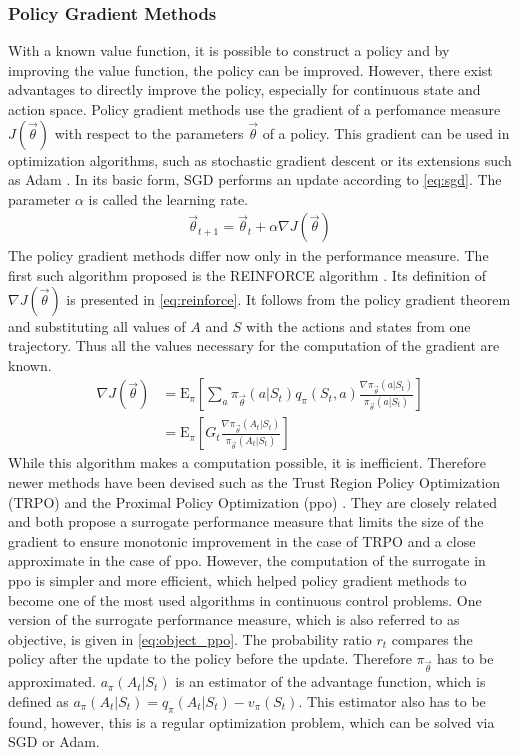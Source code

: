 \subsubsection{Policy Gradient Methods}
With a known value function, it is possible to construct a policy and by improving the value function, the policy can be improved. However, there exist advantages to directly improve the policy, especially for continuous state and action space. Policy gradient methods use the gradient of a perfomance measure $J(\vec{\theta})$ with respect to the parameters $\vec{\theta}$ of a policy. This gradient can be used in optimization algorithms, such as stochastic gradient descent \cite[p. 201]{sutton_reinforcement_2018} or its extensions such as Adam \cite{kingma_adam_2017}. In its basic form, SGD performs an update according to \ref{eq:sgd}. The parameter $\alpha$ is called the learning rate.
\begin{align}
	\vec{\theta}_{t+1} = \vec{\theta}_t + \alpha \nabla J(\vec{\theta}) \label{eq:sgd}
\end{align}
The policy gradient methods differ now only in the performance measure. The first such algorithm proposed is the REINFORCE algorithm \cite{williams_simple_1992}. Its definition of $\nabla J(\vec{\theta})$ is presented in \eqref{eq:reinforce}. It follows from the policy gradient theorem and substituting all values of $A$ and $S$ with the actions and states from one trajectory. Thus all the values necessary for the computation of the gradient are known. \cite[p.324-328]{sutton_reinforcement_2018}
\begin{align}
	\nabla J(\vec{\theta}) 
	&= \mathrm{E}_\pi \left[ \sum_{a} \pi_{\vec{\theta}} (a\vert S_t) q_\pi(S_t, a)
	\frac{\nabla \pi_{\vec{\theta}}(a\vert S_t)}{\pi_{\vec{\theta}}(a\vert S_t)} \right]\label{eq:reinforce} \\
	&= \mathrm{E}_\pi \left[G_t \frac{\nabla \pi_{\vec{\theta}}(A_t\vert S_t)}{\pi_{\vec{\theta}}(A_t\vert S_t)} \right] \label{eq:reinforce2}
\end{align}
While this algorithm makes a computation possible, it is inefficient. Therefore newer methods have been devised such as the Trust Region Policy Optimization (TRPO) \cite{schulman_trust_2017} and the Proximal Policy Optimization (ppo) \cite{schulman_proximal_2017}. They are closely related and both propose a surrogate performance measure that limits the size of the gradient to ensure monotonic improvement in the case of TRPO and a close approximate in the case of ppo. However, the computation of the surrogate in ppo is simpler and more efficient, which helped policy gradient methods to become one of the most used algorithms in continuous control problems. One version of the surrogate performance measure, which is also referred to as objective, is given in \eqref{eq:object_ppo}. The probability ratio $r_t$ compares the policy after the update to the policy before the update. Therefore $\pi_{\vec{\theta}}$ has to be approximated. $a_\pi(A_t \vert S_t)$ is an estimator of the advantage function, which is defined as $a_\pi(A_t \vert S_t) = q_\pi(A_t \vert S_t) - v_\pi(S_t)$. This estimator also has to be found, however, this is a regular optimization problem, which can be solved via SGD or Adam.
